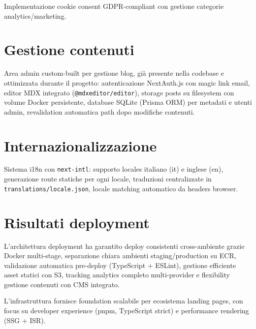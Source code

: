 Implementazione cookie consent GDPR-compliant con gestione categorie
analytics/marketing.

\section{Gestione contenuti}

Area admin custom-built per gestione blog, già presente nella codebase
e ottimizzata durante il progetto: autenticazione NextAuth.js con magic link
email, editor MDX integrato (\texttt{@mdxeditor/editor}), storage posts su
filesystem con volume Docker persistente, database SQLite (Prisma ORM) per
metadati e utenti admin, revalidation automatica path dopo modifiche
contenuti.

\section{Internazionalizzazione}

Sistema i18n con \texttt{next-intl}: supporto locales italiano (it) e
inglese (en), generazione route statiche per ogni locale, traduzioni
centralizzate in \texttt{translations/locale.json}, locale matching
automatico da headers browser.

\section{Risultati deployment}

L'architettura deployment ha garantito deploy consistenti cross-ambiente
grazie Docker multi-stage, separazione chiara ambienti staging/production
su ECR, validazione automatica pre-deploy (TypeScript + ESLint), gestione
efficiente asset statici con S3, tracking analytics completo multi-provider
e flexibility gestione contenuti con CMS integrato.

\bigskip
L'infrastruttura fornisce foundation scalabile per ecosistema landing
pages, con focus su developer experience (pnpm, TypeScript strict) e
performance rendering (SSG + ISR).